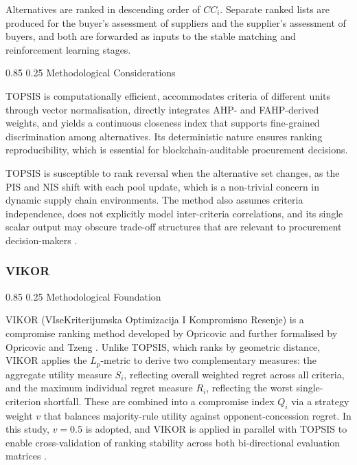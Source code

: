 \documentclass[11pt]{article}
\makeatletter
\renewcommand\paragraph{\@startsection{paragraph}{4}{\z@}%
  {0.85\baselineskip}%
  {0.25\baselineskip}%
  {\normalfont\normalsize\bfseries}}
\makeatother
\begin{document}
Alternatives are ranked in descending order of $CC_i$. Separate ranked lists are produced for the buyer's assessment of suppliers and the supplier's assessment of buyers, and both are forwarded as inputs to the stable matching and reinforcement learning stages.

\paragraph{Methodological Considerations}

\begin{description}[leftmargin=1.8em, labelsep=0.6em, style=nextline]
\item[Strengths:] TOPSIS is computationally efficient, accommodates criteria of different units through vector normalisation, directly integrates AHP- and FAHP-derived weights, and yields a continuous closeness index that supports fine-grained discrimination among alternatives. Its deterministic nature ensures ranking reproducibility, which is essential for blockchain-auditable procurement decisions.
\item[Limitations:] TOPSIS is susceptible to rank reversal when the alternative set changes, as the PIS and NIS shift with each pool update, which is a non-trivial concern in dynamic supply chain environments. The method also assumes criteria independence, does not explicitly model inter-criteria correlations, and its single scalar output may obscure trade-off structures that are relevant to procurement decision-makers \cite{ref81}.
\end{description}

\subsubsection{VIKOR}

\paragraph{Methodological Foundation}

VIKOR (VIseKriterijumska Optimizacija I Kompromisno Resenje) is a compromise ranking method developed by Opricovic \cite{ref82} and further formalised by Opricovic and Tzeng \cite{ref83}. Unlike TOPSIS, which ranks by geometric distance, VIKOR applies the $L_p$-metric to derive two complementary measures: the aggregate utility measure $S_i$, reflecting overall weighted regret across all criteria, and the maximum individual regret measure $R_i$, reflecting the worst single-criterion shortfall. These are combined into a compromise index $Q_i$ via a strategy weight $v$ that balances majority-rule utility against opponent-concession regret. In this study, $v=0.5$ is adopted, and VIKOR is applied in parallel with TOPSIS to enable cross-validation of ranking stability across both bi-directional evaluation matrices \cite{ref75}.
\end{document}
